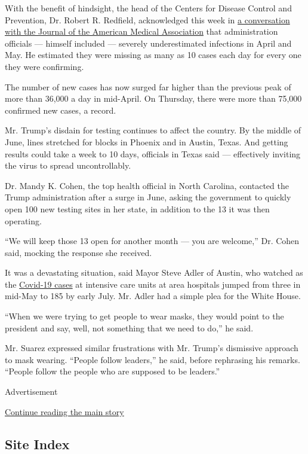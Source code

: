 With the benefit of hindsight, the head of the Centers for Disease
Control and Prevention, Dr. Robert R. Redfield, acknowledged this week
in
\href{https://jamanetwork.com/journals/jama/pages/conversations-with-dr-bauchner}{a
conversation with the Journal of the American Medical Association} that
administration officials --- himself included --- severely
underestimated infections in April and May. He estimated they were
missing as many as 10 cases each day for every one they were confirming.

The number of new cases has now surged far higher than the previous peak
of more than 36,000 a day in mid-April. On Thursday, there were more
than 75,000 confirmed new cases, a record.

Mr. Trump's disdain for testing continues to affect the country. By the
middle of June, lines stretched for blocks in Phoenix and in Austin,
Texas. And getting results could take a week to 10 days, officials in
Texas said --- effectively inviting the virus to spread uncontrollably.

Dr. Mandy K. Cohen, the top health official in North Carolina, contacted
the Trump administration after a surge in June, asking the government to
quickly open 100 new testing sites in her state, in addition to the 13
it was then operating.

``We will keep those 13 open for another month --- you are welcome,''
Dr. Cohen said, mocking the response she received.

It was a devastating situation, said Mayor Steve Adler of Austin, who
watched as the
\href{https://dshs.texas.gov/coronavirus/additionaldata.aspx}{Covid-19
cases} at intensive care units at area hospitals jumped from three in
mid-May to 185 by early July. Mr. Adler had a simple plea for the White
House.

``When we were trying to get people to wear masks, they would point to
the president and say, well, not something that we need to do,'' he
said.

Mr. Suarez expressed similar frustrations with Mr. Trump's dismissive
approach to mask wearing. ``People follow leaders,'' he said, before
rephrasing his remarks. ``People follow the people who are supposed to
be leaders.''

Advertisement

\protect\hyperlink{after-bottom}{Continue reading the main story}

\hypertarget{site-index}{%
\subsection{Site Index}\label{site-index}}

